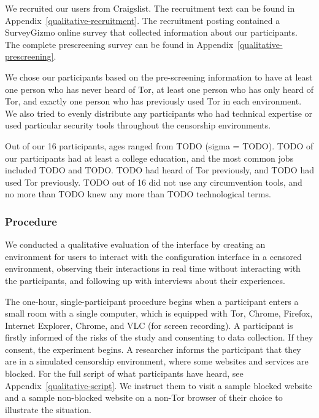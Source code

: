 \documentclass[USenglish,oneside,twocolumn]{article}
\begin{document}
We recruited our users from Craigslist. The recruitment text can be found in 
Appendix~\ref{qualitative-recruitment}. The recruitment posting contained a 
SurveyGizmo online survey that collected information about our participants.
The complete prescreening survey can be found in Appendix~\ref{qualitative-prescreening}.  

We chose our participants based on the pre-screening information to have 
at least one person who has never heard of Tor, at least one person who has 
only heard of Tor, and exactly one person who has previously used Tor in each
environment. We also tried to evenly distribute any participants who had technical
expertise or used particular security tools throughout the censorship environments. 

Out of our 16 participants, ages ranged from {\color {red} TODO}
(sigma = {\color {red} TODO}). {\color {red} TODO} of our participants had at least
a college education, and the most common jobs included {\color {red} TODO} and
{\color {red} TODO}. {\color {red} TODO} had heard of Tor previously, 
and {\color {red} TODO} had used Tor previously. {\color {red} TODO} out of 
16 did not use any circumvention tools, and no more than {\color {red} TODO} 
knew any more than {\color {red} TODO} technological terms.

\subsubsection{Procedure}
We conducted a qualitative evaluation of the interface by creating an environment 
for users to interact with the configuration interface in a censored environment, 
observing their interactions in real time without interacting with the participants, 
and following up with interviews about their experiences.

The one-hour, single-participant procedure begins when a participant enters a small 
room with a single computer, which is equipped with Tor, Chrome, Firefox, Internet Explorer, 
Chrome, and VLC (for screen recording). A participant is firstly informed of 
the risks of the study and consenting to data collection. If they consent, the 
experiment begins. A researcher informs the participant that they are in a
simulated censorship environment, where some websites and services are blocked. 
For the full script of what participants have heard, see Appendix~\ref{qualitative-script}. We
instruct them to visit a sample blocked website and a sample non-blocked website on a
non-Tor browser of their choice to illustrate the situation.
\end{document}
